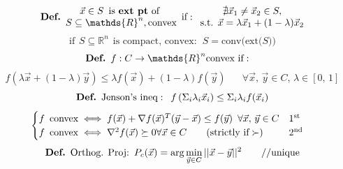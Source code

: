 \documentclass[twocolumn,12pt]{article}    %
\newcommand\Def{\text{\textbf{Def.}} \hspace{5pt}}
\newcommand \rn {\mathds{R}^n}
\newcommand \hfive {\hspace{5pt}}
\begin{document}
\begin{equation*}
    \Def \begin{matrix} \vec{x}\in S \hspace{5pt} \text{is \textbf{ext pt} of } \\  S \subseteq \mathds{R}^n, \text{convex}\end{matrix}\hspace{5pt} \text{if}: \hspace{5pt} \begin{matrix} \nexists \vec{x}_1 \neq \vec{x}_2 \in S,\\ \text{s.t. }  \vec{x} = \lambda\vec{x}_1 + (1-\lambda)\vec{x}_2\end{matrix}
\end{equation*}
\begin{equation*}
    \text{if} \hspace{5pt} S \subseteq \rn \hspace{5pt} \text{is compact, convex}: \hspace{5pt} S = \text{conv(ext(}S))
\end{equation*}
\begin{equation*}
    \hspace{-10pt} \Def f:C\rightarrow\rn \text{convex if}:
\end{equation*}
\begin{equation*}
    f(\lambda \vec{x} +(1-\lambda)\vec{y}) \leq \lambda f(\vec{x}) + (1-\lambda)f(\vec{y}) \hspace{20pt} \forall \vec{x},\, \vec{y} \in C,\, \lambda \in [0,\,1] 
\end{equation*}
\begin{equation*}
    \Def \text{Jenson's ineq}: \hfive f\left(\Sigma_i \lambda_i \vec{x}_i\right) \leq \Sigma_i\lambda_if(\vec{x}_i)
\end{equation*}
\begin{equation*}
    \hspace{-10pt}\begin{cases}
        f \hfive \text{convex} \iff f(\vec{x}) + \nabla f(\vec{x})^T (\vec{y}-\vec{x}) \leq f(\vec{y}) \hfive \forall \vec{x},\, \vec{y} \in C  & 1^{\text{st}}\\
        f \hfive \text{convex} \iff \nabla^2f(\vec{x}) \succeq 0 \forall \vec{x} \in C \hspace{20pt} (\text{strictly if} \succ) & 2^{\text{nd}}
    \end{cases}
\end{equation*}
\begin{equation*}
    \Def \text{Orthog. Proj:} \hfive P_c (\vec{x})  = \arg \min_{\vec{y}\in C} ||\vec{x} - \vec{y}||^2 \hspace{20pt} // \text{unique}
\end{equation*}
\end{document}
